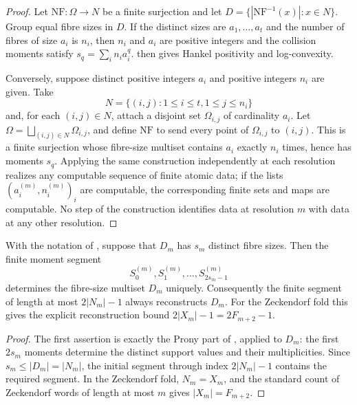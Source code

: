 \begin{proof}
Let \(\mathrm{NF}\colon\Omega\to N\) be a finite surjection and let
\(D=\{|\mathrm{NF}^{-1}(x)|:x\in N\}\).  Group equal fibre sizes in \(D\).  If
the distinct sizes are \(a_1,
\ldots,a_t\) and the number of fibres of size \(a_i\) is \(n_i\), then
\(n_i\) and \(a_i\) are positive integers and the collision moments satisfy
\(s_q=\sum_i n_i a_i^q\).   then
gives Hankel positivity and log-convexity.

Conversely, suppose distinct positive integers \(a_i\) and positive integers
\(n_i\) are given.  Take
\[
  N=\{(i,j):1\le i\le t,
  1\le j\le n_i\}
\]
and, for each \((i,j)\in N\), attach a disjoint set
\(\Omega_{i,j}\) of cardinality \(a_i\).  Let
\(\Omega=\bigsqcup_{(i,j)\in N}\Omega_{i,j}\), and define
\(\mathrm{NF}\) to send every point of \(\Omega_{i,j}\) to \((i,j)\).  This is
a finite surjection whose fibre-size multiset contains \(a_i\) exactly \(n_i\)
times, hence has moments \(s_q\).  Applying the same construction independently
at each resolution realizes any computable sequence of finite atomic data; if
the lists \((a_i^{(m)},n_i^{(m)})_i\) are computable, the corresponding finite
sets and maps are computable.  No step of the construction identifies data at
resolution \(m\) with data at any other resolution.
\end{proof}

\begin{corollary}
\label{thm:prony}
With the notation of , suppose that \(D_m\) has \(s_m\)
distinct fibre sizes.  Then the finite moment segment
\[
  S_0^{(m)},S_1^{(m)},\ldots,S_{2s_m-1}^{(m)}
\]
determines the fibre-size multiset \(D_m\) uniquely.  Consequently the finite
segment of length at most \(2|N_m|-1\) always reconstructs \(D_m\).  For the
Zeckendorf fold this gives the explicit reconstruction bound
\(2|X_m|-1=2F_{m+2}-1\).
\end{corollary}

\begin{proof}
The first assertion is exactly the Prony part of
, applied to \(D_m\): the first
\(2s_m\) moments determine the distinct support values and their multiplicities.
Since \(s_m\le |D_m|=|N_m|\), the initial segment through index \(2|N_m|-1\)
contains the required segment.  In the Zeckendorf fold, \(N_m=X_m\), and the
standard count of Zeckendorf words of length at most \(m\) gives
\(|X_m|=F_{m+2}\).
\end{proof}

